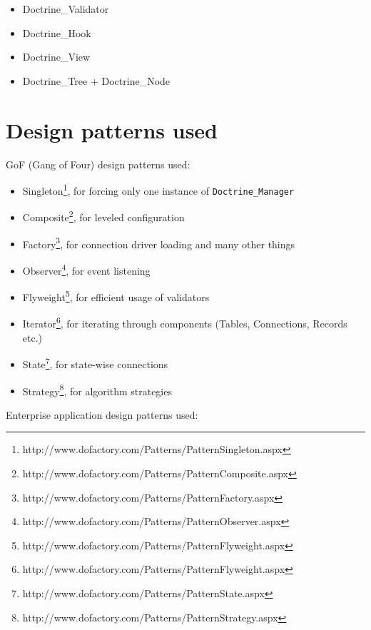 \documentclass[11pt,a4paper]{report}
\begin{document}
\begin{itemize}
\item{Doctrine\_Validator}
\item{Doctrine\_Hook}
\item{Doctrine\_View}
\item{Doctrine\_Tree + Doctrine\_Node}
\end{itemize}
\section{Design patterns used}
GoF (Gang of Four) design patterns used:

\begin{itemize}
\item{Singleton\footnote{http://www.dofactory.com/Patterns/PatternSingleton.aspx}, for forcing only one instance of \texttt{Doctrine\_Manager}}
\item{Composite\footnote{http://www.dofactory.com/Patterns/PatternComposite.aspx}, for leveled configuration}
\item{Factory\footnote{http://www.dofactory.com/Patterns/PatternFactory.aspx}, for connection driver loading and many other things}
\item{Observer\footnote{http://www.dofactory.com/Patterns/PatternObserver.aspx}, for event listening}
\item{Flyweight\footnote{http://www.dofactory.com/Patterns/PatternFlyweight.aspx}, for efficient usage of validators}
\item{Iterator\footnote{http://www.dofactory.com/Patterns/PatternFlyweight.aspx}, for iterating through components (Tables, Connections, Records etc.)}
\item{State\footnote{http://www.dofactory.com/Patterns/PatternState.aspx}, for state-wise connections}
\item{Strategy\footnote{http://www.dofactory.com/Patterns/PatternStrategy.aspx}, for algorithm strategies}
\end{itemize}
Enterprise application design patterns used:
\end{document}
